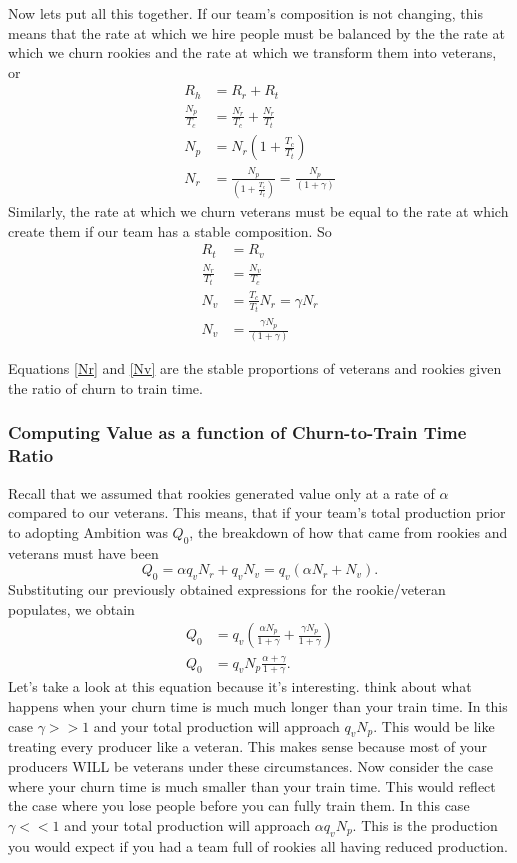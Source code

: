 \documentclass[paper=a4, fontsize=11pt abstract]{scrartcl}
\numberwithin{equation}{section}		%
\numberwithin{figure}{section}			%
\numberwithin{table}{section}				%
\begin{document}
Now lets put all this together.  If our team's composition is not changing, this means that the rate at which we hire people must be balanced by the the rate at which we churn rookies and the rate at which we transform them into veterans, or
\begin{align}
    R_h &= R_r + R_t \\
    \frac{N_p}{T_c} &= \frac{N_r}{T_c} + \frac{N_r}{T_t} \\
    N_p &= N_r\left(1 + \frac{T_c}{T_t}\right) \\
    N_r &= \frac{N_p}{\left(1 + \frac{T_c}{T_t}\right)} = \frac{N_p}{\left(1 + \gamma\right)} \label{Nr}
\end{align}
Similarly, the rate at which we churn veterans must be equal to the rate at which create them if our team has a stable composition.  So
\begin{align}
    R_t &= R_v \\
    \frac{N_r}{T_t} &= \frac{N_v}{T_c} \\
    N_v &= \frac{T_c}{T_t}N_r = \gamma N_r \\
    N_v &= \frac{\gamma N_p}{\left(1 + \gamma\right)} \label{Nv}
\end{align}

Equations \ref{Nr} and \ref{Nv} are the stable proportions of veterans and rookies given the ratio of churn to train time.

\subsubsection{Computing Value as a function of Churn-to-Train Time Ratio}
Recall that we assumed that rookies generated value only at a rate of $\alpha$ compared to our veterans.  This means, that if your team's total production prior to adopting Ambition was $Q_0$, the breakdown of how that came from rookies and veterans must have been
\begin{equation}
    Q_0 = \alpha q_{v} N_r + q_{v} N_v = q_{v}\left(\alpha N_r + N_v\right).
\end{equation}
Substituting our previously obtained expressions for the rookie/veteran populates, we obtain
\begin{align}
    Q_0 &= q_{v}\left(\frac{\alpha N_p}{1 + \gamma} + \frac{\gamma N_p}{1 + \gamma}\right)  \\
    Q_0 &= q_{v} N_p\frac{\alpha + \gamma}{1 + \gamma} \label{Q0}.
\end{align}
Let's take a look at this equation because it's interesting.  think about what happens when your churn time is much much longer than your train time.  In this case $\gamma >> 1$ and your total production will approach $q_{v}N_p$. This would be like treating every producer like a veteran.  This makes sense because most of your producers WILL be veterans under these circumstances.  Now consider the case where your churn time is much smaller than your train time.  This would reflect the case where you lose people before you can fully train them.  In this case $\gamma << 1$ and your total production will approach $\alpha q_{v} N_p$.  This is the production you would expect if you had a team full of rookies all having reduced production.
\end{document}
